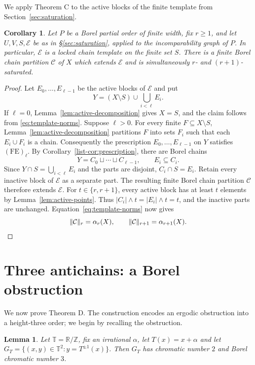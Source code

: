 \documentclass[11pt,reqno]{amsart}
\theoremstyle{plain}
\newtheorem{lemma}[theorem]{Lemma}
\newtheorem{corollary}[theorem]{Corollary}
\theoremstyle{definition}
\theoremstyle{remark}
\newcommand{\T}{\mathbb T}
\newcommand{\R}{\mathbb R}
\newcommand{\Z}{\mathbb Z}
\begin{document}
We apply Theorem C to the active blocks of the finite template
from Section~\ref{sec:saturation}.

\begin{corollary}\label{cor:preserve-locked}
Let $P$ be a Borel partial order of finite width, fix $r\ge1$, and let
$U,V,S,\mathcal E$ be as in \S\ref{sec:saturation}, applied to the
incomparability graph of $P$. In particular, $\mathcal E$ is a locked
chain template on the finite set $S$.
There is a finite Borel chain partition $\mathcal C$ of $X$ which extends
$\mathcal E$ and is simultaneously $r$- and $(r+1)$-saturated.
\end{corollary}

\begin{proof}
Let $E_0,\ldots,E_{\ell-1}$ be the active blocks of $\mathcal E$ and put
\[
Y=(X\setminus S)\cup\bigcup_{i<\ell}E_i.
\]
If $\ell=0$, Lemma~\ref{lem:active-decomposition} gives $X=S$, and the
claim follows from \eqref{eq:template-norms}.
Suppose $\ell>0$. For every finite $F\subseteq X\setminus S$,
Lemma~\ref{lem:active-decomposition} partitions $F$ into sets $F_i$ such
that each $E_i\cup F_i$ is a chain. Consequently the prescription
$E_0,\ldots,E_{\ell-1}$ on $Y$ satisfies $\mathrm{(FE)}_\ell$.
By Corollary~\ref{list-cor:prescription}, there are Borel chains
\[
Y=C_0\sqcup\cdots\sqcup C_{\ell-1},\qquad E_i\subseteq C_i.
\]
Since $Y\cap S=\bigcup_{i<\ell}E_i$ and the parts are disjoint,
$C_i\cap S=E_i$. Retain every inactive block of $\mathcal E$ as a separate
part. The resulting finite Borel chain partition $\mathcal C$ therefore
extends $\mathcal E$.
For $t\in\{r,r+1\}$, every active block has at least $t$ elements by
Lemma~\ref{lem:active-points}. Thus $|C_i|\wedge t=|E_i|\wedge t=t$,
and the inactive parts are unchanged. Equation~\eqref{eq:template-norms}
now gives
\[
\lVert\mathcal C\rVert_r=\alpha_r(X),\qquad
\lVert\mathcal C\rVert_{r+1}=\alpha_{r+1}(X).
\qedhere
\]
\end{proof}

\section{Three antichains: a Borel obstruction}
\label{subsec:counterexample}

We now prove Theorem D. The construction encodes an ergodic obstruction into a
height-three order; we begin by recalling the obstruction.

\begin{lemma}
\label{lem:rotation}
Let $\T=\R/\Z$, fix an irrational $\alpha$, let $T(x)=x+\alpha$ and let
$G_T=\{(x,y)\in\T^2:y=T^{\pm1}(x)\}$. Then $G_T$ has chromatic number $2$ and
Borel chromatic number $3$.
\end{lemma}
\end{document}

